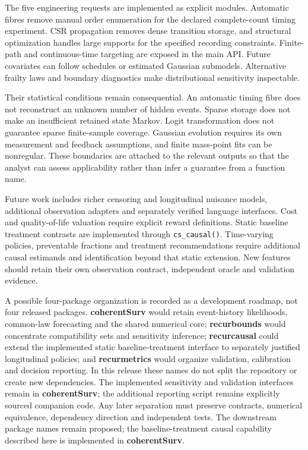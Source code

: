\documentclass[article,nojss]{jss}
\newcommand{\pkg}[1]{\textbf{#1}}
\newcommand{\code}[1]{\texttt{#1}}
\begin{document}
The five engineering requests are implemented as explicit modules. Automatic fibres remove manual order enumeration for the declared complete-count timing experiment. CSR propagation removes dense transition storage, and structural optimization handles large supports for the specified recording constraints. Finite-path and continuous-time targeting are exposed in the main API. Future covariates can follow schedules or estimated Gaussian submodels. Alternative frailty laws and boundary diagnostics make distributional sensitivity inspectable.

Their statistical conditions remain consequential. An automatic timing fibre does not reconstruct an unknown number of hidden events. Sparse storage does not make an insufficient retained state Markov. Logit transformation does not guarantee sparse finite-sample coverage. Gaussian evolution requires its own measurement and feedback assumptions, and finite mass-point fits can be nonregular. These boundaries are attached to the relevant outputs so that the analyst can assess applicability rather than infer a guarantee from a function name.

Future work includes richer censoring and longitudinal nuisance models, additional observation adapters and separately verified language interfaces. Cost and quality-of-life valuation require explicit reward definitions. Static baseline treatment contrasts are implemented through \code{cs\_causal()}. Time-varying policies, preventable fractions and treatment recommendations require additional causal estimands and identification beyond that static extension. New features should retain their own observation contract, independent oracle and validation evidence.

A possible four-package organization is recorded as a development roadmap, not four released packages. \pkg{coherentSurv} would retain event-history likelihoods, common-law forecasting and the shared numerical core; \pkg{recurbounds} would concentrate compatibility sets and sensitivity inference; \pkg{recurcausal} could extend the implemented static baseline-treatment interface to separately justified longitudinal policies; and \pkg{recurmetrics} would organize validation, calibration and decision reporting. In this release these names do not split the repository or create new dependencies. The implemented sensitivity and validation interfaces remain in \pkg{coherentSurv}; the additional reporting script remains explicitly sourced companion code. Any later separation must preserve contracts, numerical equivalence, dependency direction and independent tests. The downstream package names remain proposed; the baseline-treatment causal capability described here is implemented in \pkg{coherentSurv}.
\end{document}
